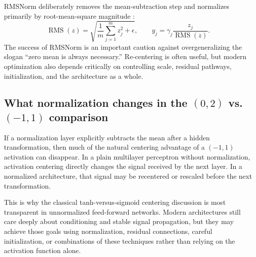 \documentclass[11pt]{article}
\begin{document}
RMSNorm deliberately removes the mean-subtraction step and normalizes primarily by root-mean-square magnitude \cite{zhang2019}:
\begin{equation}
  \operatorname{RMS}(z)=\sqrt{\frac{1}{m}\sum_{j=1}^{m}z_j^2+\epsilon},
  \qquad
  y_j=\gamma_j\frac{z_j}{\operatorname{RMS}(z)}.
\end{equation}
The success of RMSNorm is an important caution against overgeneralizing the slogan ``zero mean is always necessary.''  Re-centering is often useful, but modern optimization also depends critically on controlling scale, residual pathways, initialization, and the architecture as a whole.

\subsection{What normalization changes in the \((0,2)\) vs. \((-1,1)\) comparison}

If a normalization layer explicitly subtracts the mean after a hidden transformation, then much of the natural centering advantage of a \((-1,1)\) activation can disappear.  In a plain multilayer perceptron without normalization, activation centering directly changes the signal received by the next layer.  In a normalized architecture, that signal may be recentered or rescaled before the next transformation.

This is why the classical tanh-versus-sigmoid centering discussion is most transparent in unnormalized feed-forward networks.  Modern architectures still care deeply about conditioning and stable signal propagation, but they may achieve those goals using normalization, residual connections, careful initialization, or combinations of these techniques rather than relying on the activation function alone.
\end{document}
